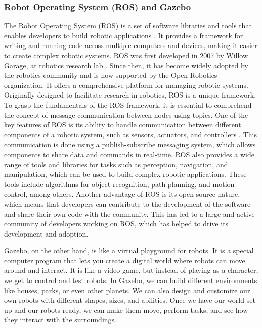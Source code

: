 \documentclass[12pt,oneside]{article}
\begin{document}
\subsubsection{Robot Operating System (ROS) and Gazebo}
The Robot Operating System (ROS) is a set of software libraries and tools that enables developers to build robotic applications \cite{15_quigley2009ros}. It provides a framework for writing and running code across multiple computers and devices, making it easier to create complex robotic systems. ROS was first developed in 2007 by Willow Garage, at robotics research lab \cite{16_cousins2014willow}. Since then, it has become widely adopted by the robotics community and is now supported by the Open Robotics organization. It offers a comprehensive platform for managing robotic systems. Originally designed to facilitate research in robotics, ROS is a unique framework. To grasp the fundamentals of the ROS framework, it is essential to comprehend the concept of message communication between nodes using topics.
One of the key features of ROS is its ability to handle communication between different components of a robotic system, such as sensors, actuators, and controllers \cite{17_emmi2014new}. This communication is done using a publish-subscribe messaging system, which allows components to share data and commands in real-time. ROS also provides a wide range of tools and libraries for tasks such as perception, navigation, and manipulation, which can be used to build complex robotic applications. These tools include algorithms for object recognition, path planning, and motion control, among others. Another advantage of ROS is its open-source nature, which means that developers can contribute to the development of the software and share their own code with the community. This has led to a large and active community of developers working on ROS, which has helped to drive its development and adoption.

Gazebo, on the other hand, is like a virtual playground for robots. It is a special computer program that lets you create a digital world where robots can move around and interact. It is like a video game, but instead of playing as a character, we get to control and test robots.
In Gazebo, we can build different environments like houses, parks, or even other planets. We can also design and customize our own robots with different shapes, sizes, and abilities. Once we have our world set up and our robots ready, we can make them move, perform tasks, and see how they interact with the surroundings.
\end{document}

